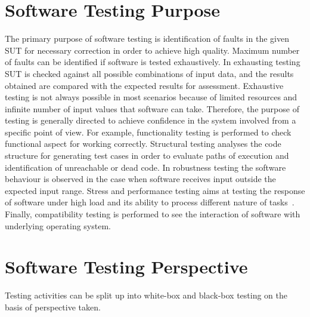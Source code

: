 \section{Software Testing Purpose}
The primary purpose of software testing is identification of faults in the given SUT for necessary correction in order to achieve high quality. Maximum number of faults can be identified if software is tested exhaustively. In exhausting testing SUT is checked against all possible combinations of input data, and the results obtained are compared with the expected results for assessment. Exhaustive testing is not always possible in most scenarios because of limited resources and infinite number of input values that software can take. Therefore, the purpose of testing is generally directed to achieve confidence in the system involved from a specific point of view. For example, functionality testing is performed to check functional aspect for working correctly. Structural testing analyses the code structure for generating test cases in order to evaluate paths of execution and identification of unreachable or dead code. In robustness testing the software behaviour is observed in the case when software receives input outside the expected input range. Stress and performance testing aims at testing the response of software under high load and its ability to process different nature of tasks~\cite{cohen2005robustness}. Finally, compatibility testing is performed to see the interaction of software with underlying operating system.

\section{Software Testing Perspective}
Testing activities can be split up into white-box and black-box testing on the basis of perspective taken. 

